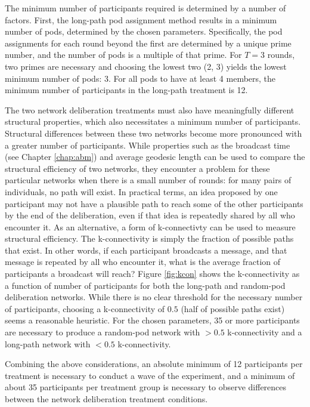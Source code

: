 The minimum number of participants required is determined by a number of factors.
First, the long-path pod assignment method results in a minimum number of pods,
determined by the chosen parameters.
Specifically, the pod assignments for each round beyond the first are determined
by a unique prime number,
and the number of pods is a multiple of that prime.
For $T=3$ rounds, two primes are necessary and choosing the lowest two (2, 3)
yields the lowest minimum number of pods: 3.
For all pods to have at least 4 members, the minimum number of participants in
the long-path treatment is 12.

The two network deliberation treatments must also have meaningfully different
structural properties,
which also necessitates a minimum number of participants.
Structural differences between these two networks become more pronounced
with a greater number of participants.
While properties such as the broadcast time (see Chapter \ref{chap:abm})
and average geodesic length can be used to compare the structural efficiency of
two networks,
they encounter a problem for these particular networks
when there is a small number of rounds:
for many pairs of individuals, no path will exist.
In practical terms,
an idea proposed by one participant may not have a plausible
path to reach some of the other participants by the end of the deliberation,
even if that idea is repeatedly shared by all who encounter it.
As an alternative, a form of k-connectivty can be used to measure
structural efficiency.
The k-connectivity is simply the fraction of possible paths that exist.
In other words, if each participant broadcasts a message, and that message is
repeated by all who encounter it, what is the average fraction of participants
a broadcast will reach?
Figure \ref{fig:kcon} shows the k-connectivity as a function of number of
participants for both the long-path and random-pod deliberation networks.
While there is no clear threshold for the necessary number of participants,
choosing a k-connectivity of $0.5$ (half of possible paths exist) seems a
reasonable heuristic.
For the chosen parameters, 35 or more participants are necessary to produce
a random-pod network with $>0.5$ k-connectivity and
a long-path network with $<0.5$ k-connectivity.

Combining the above considerations,
an absolute minimum of 12 participants per treatment is necessary to conduct
a wave of the experiment,
and a minimum of about 35 participants per treatment group is necessary to
observe differences between the network deliberation treatment conditions.

